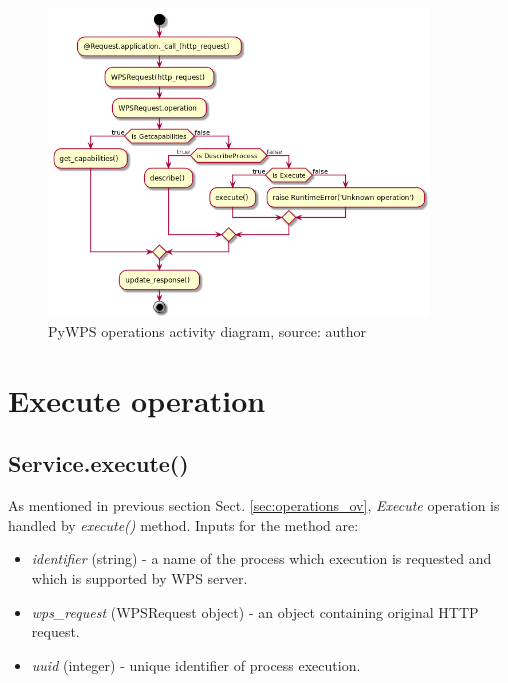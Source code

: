 \begin{figure}[h!]
\centering
\includegraphics[width=0.9\textwidth]{img/Diag_operations.png}
\caption{PyWPS operations activity diagram, source: author}
\label{fig:Diag_operations}
\end{figure}

\section{Execute operation}
\subsection{Service.execute()}
As mentioned in previous section Sect. \ref{sec:operations_ov}, \textit{Execute} operation is handled by \textit{execute()} method.
Inputs for the method are:
\begin{itemize}
\item \textit{identifier} (string) - a name of the process which execution is requested and which is supported by WPS server.
\item \textit{wps\_request} (WPSRequest object) - an object containing original HTTP request.
\item \textit{uuid} (integer) - unique identifier of process execution.
\end{itemize}

